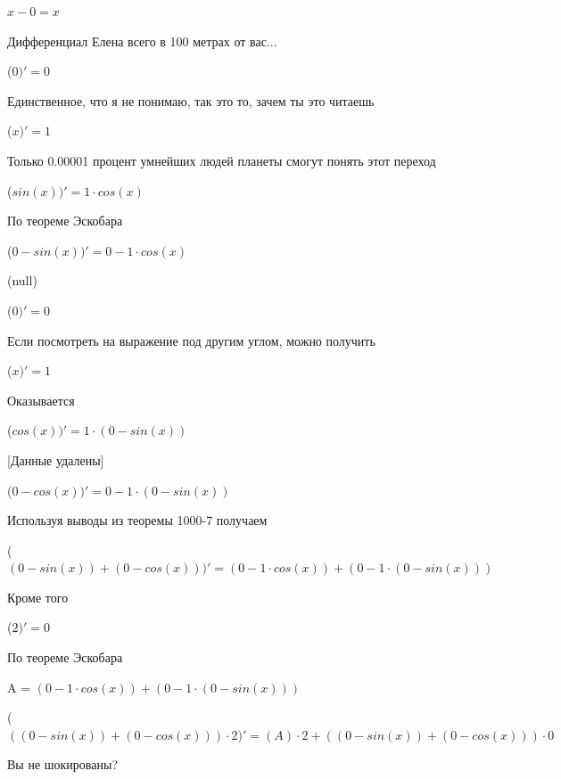 \documentclass[12pt,a4paper,fleqn]{article}
\begin{document}
\begin{center}
$x-0 = x$\end{center}
Дифференциал Елена всего в 100 метрах от вас...

\begin{center}
 ($0)'
  = 0$\end{center}
Единственное, что я не понимаю, так это то, зачем ты это читаешь

\begin{center}
 ($x)'
  = 1$\end{center}
Только 0.00001 процент умнейших людей планеты смогут понять этот переход

\begin{center}
 ($sin(x))'
  = 1 \cdot cos(x)$\end{center}
По теореме Эскобара

\begin{center}
 ($0-sin(x))'
  = 0-1 \cdot cos(x)$\end{center}
(null)\cite{link4}

\begin{center}
 ($0)'
  = 0$\end{center}
Если посмотреть на выражение под другим углом, можно получить

\begin{center}
 ($x)'
  = 1$\end{center}
Оказывается

\begin{center}
 ($cos(x))'
  = 1 \cdot (0-sin(x))$\end{center}
[Данные удалены]

\begin{center}
 ($0-cos(x))'
  = 0-1 \cdot (0-sin(x))$\end{center}
Используя выводы из теоремы 1000-7 получаем

\begin{center}
 ($(0-sin(x))+(0-cos(x)))'
  = (0-1 \cdot cos(x))+(0-1 \cdot (0-sin(x)))$\end{center}
Кроме того

\begin{center}
 ($2)'
  = 0$\end{center}
По теореме Эскобара

\begin{center}
A = $(0-1 \cdot cos(x))+(0-1 \cdot (0-sin(x)))$\end{center}
\begin{center}
 ($((0-sin(x))+(0-cos(x))) \cdot 2)'
  = (A) \cdot 2+((0-sin(x))+(0-cos(x))) \cdot 0$\end{center}
Вы не шокированы?\cite{link3}
\end{document}
